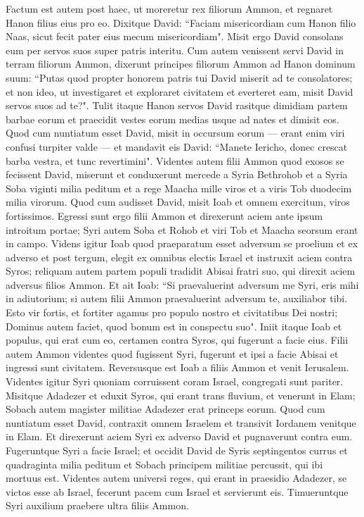 \begin{biblechapter}  
\verse Factum est autem post haec, ut moreretur rex filiorum Ammon, et regnaret Hanon filius eius pro eo. 
\verse Dixitque David: “Faciam misericordiam cum Hanon filio Naas, sicut fecit pater eius mecum misericordiam". Misit ergo David consolans eum per servos suos super patris interitu. Cum autem venissent servi David in terram filiorum Ammon, 
\verse dixerunt principes filiorum Ammon ad Hanon dominum suum: “Putas quod propter honorem patris tui David miserit ad te consolatores; et non ideo, ut investigaret et exploraret civitatem et everteret eam, misit David servos suos ad te?". 
\verse Tulit itaque Hanon servos David rasitque dimidiam partem barbae eorum et praecidit vestes eorum medias usque ad nates et dimisit eos. 
\verse Quod cum nuntiatum esset David, misit in occursum eorum — erant enim viri confusi turpiter valde — et mandavit eis David: “Manete Iericho, donec crescat barba vestra, et tunc revertimini". 
\verse Videntes autem filii Ammon quod exosos se fecissent David, miserunt et conduxerunt mercede a Syria Bethrohob et a Syria Soba viginti milia peditum et a rege Maacha mille viros et a viris Tob duodecim milia virorum. 
\verse Quod cum audisset David, misit Ioab et omnem exercitum, viros fortissimos. 
\verse Egressi sunt ergo filii Ammon et direxerunt aciem ante ipsum introitum portae; Syri autem Soba et Rohob et viri Tob et Maacha seorsum erant in campo. 
\verse Videns igitur Ioab quod praeparatum esset adversum se proelium et ex adverso et post tergum, elegit ex omnibus electis Israel et instruxit aciem contra Syros; 
\verse reliquam autem partem populi tradidit Abisai fratri suo, qui direxit aciem adversus filios Ammon. 
\verse Et ait Ioab: “Si praevaluerint adversum me Syri, eris mihi in adiutorium; si autem filii Ammon praevaluerint adversum te, auxiliabor tibi. 
\verse Esto vir fortis, et fortiter agamus pro populo nostro et civitatibus Dei nostri; Dominus autem faciet, quod bonum est in conspectu suo".  
\verse Iniit itaque Ioab et populus, qui erat cum eo, certamen contra Syros, qui fugerunt a facie eius. 
\verse Filii autem Ammon videntes quod fugissent Syri, fugerunt et ipsi a facie Abisai et ingressi sunt civitatem. Reversusque est Ioab a filiis Ammon et venit Ierusalem. 
\verse Videntes igitur Syri quoniam corruissent coram Israel, congregati sunt pariter. 
\verse Misitque Adadezer et eduxit Syros, qui erant trans fluvium, et venerunt in Elam; Sobach autem magister militiae Adadezer erat princeps eorum. 
\verse Quod cum nuntiatum esset David, contraxit omnem Israelem et transivit Iordanem venitque in Elam. Et direxerunt aciem Syri ex adverso David et pugnaverunt contra eum. 
\verse Fugeruntque Syri a facie Israel; et occidit David de Syris septingentos currus et quadraginta milia peditum et Sobach principem militiae percussit, qui ibi mortuus est. 
\verse Videntes autem universi reges, qui erant in praesidio Adadezer, se victos esse ab Israel, fecerunt pacem cum Israel et servierunt eis. Timueruntque Syri auxilium praebere ultra filiis Ammon. 
\end{biblechapter}

